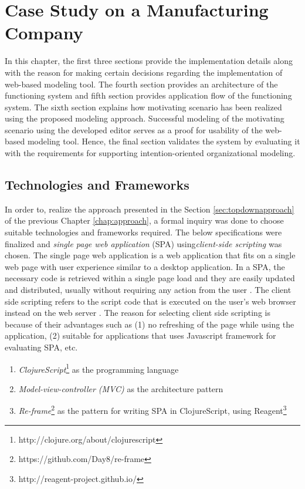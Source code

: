 \chapter{Case Study on a Manufacturing Company}
\label{chap:casestudy}

In this chapter, the first three sections provide the implementation details along with the reason for making certain decisions regarding the implementation of web-based modeling tool. The fourth section provides an architecture of the functioning system and fifth section provides application flow of the functioning system. The sixth section explains how motivating scenario has been realized using the proposed modeling approach. Successful modeling of the motivating scenario using the developed editor serves as a proof for usability of the web-based modeling tool. Hence, the final section validates the system by evaluating it with the requirements for supporting intention-oriented organizational modeling. 

\section{Technologies and Frameworks}
\label{subsec:specifications}
In order to, realize the approach presented in the Section \ref{sec:topdownapproach} of the previous Chapter \ref{chap:approach}, a formal inquiry was done to choose suitable technologies and frameworks required. The below specifications were finalized and \textit{single page web application} (SPA) using\textit{client-side scripting} was chosen. The single page web application is a web application that fits on a single web page with user experience similar to a desktop application. In a SPA, the necessary code is retrieved within a single page load and they are easily updated and distributed, usually without requiring any action from the user \cite{Mikowski2013}. The client side scripting refers to the script code that is executed on the user's web browser instead on the web server \cite{Sierra2012}. The reason for selecting client side scripting is because of their advantages such as (1) no refreshing of the page while using the application, (2) suitable for applications that uses Javascript framework for evaluating SPA, etc. 

\begin{enumerate}   
	\item \textit{ClojureScript}\footnote{http://clojure.org/about/clojurescript} as the programming language
	\item \textit{Model-view-controller (MVC)} \cite{Deacon2009}  as the architecture pattern
	\item \textit{Re-frame}\footnote{https://github.com/Day8/re-frame} as the pattern for writing SPA in ClojureScript, using Reagent\footnote{http://reagent-project.github.io/}	
\end{enumerate}

